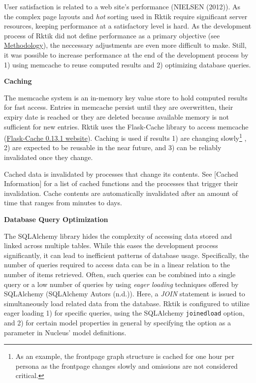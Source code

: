 
User satisfaction is related to a web site's performance (NIELSEN
(2012)). As the complex page layouts and \emph{hot} sorting used in
Rktik require significant server resources, keeping performance at a
satisfactory level is hard. As the development process of Rktik did not
define performance as a primary objective (see
\hyperref[methodology]{Methodology}), the neccessary adjustments are
even more difficult to make. Still, it was possible to increase
performance at the end of the development process by 1) using memcache
to reuse computed results and 2) optimizing database queries.

\textbf{Caching}

The memcache system is an in-memory key value store to hold computed
results for fast access. Entries in memcache persist until they are
overwritten, their expiry date is reached or they are deleted because
available memory is not sufficient for new entries. Rktik uses the
Flask-Cache library to access memcache
(\href{https://pypi.python.org/pypi/Flask-Cache/0.13.1}{Flask-Cache
0.13.1 website}). Caching is used if results 1) are changing
slowly\footnote{As an example, the frontpage graph structure is cached
  for one hour per persona as the frontpage changes slowly and omissions
  are not considered critical.} , 2) are expected to be reusable in the
near future, and 3) can be reliably invalidated once they change.

Cached data is invalidated by processes that change its contents. See
{[}Cached Information{]} for a list of cached functions and the
processes that trigger their invalidation. Cache contents are
automatically invalidated after an amount of time that ranges from
minutes to days.

\textbf{Database Query Optimization}

The SQLAlchemy library hides the complexity of accessing data stored and
linked across multiple tables. While this eases the development process
significantly, it can lead to inefficient patterns of database usage.
Specifically, the number of queries required to access data can be in a
linear relation to the number of items retrieved. Often, such queries
can be combined into a single query or a low number of queries by using
\emph{eager loading} techniques offered by SQLAlchemy (SQLAlchemy Autors
(n.d.)). Here, a \emph{JOIN} statement is issued to simultaneously load
related data from the database. Rktik is configured to utilize eager
loading 1) for specific queries, using the SQLAlchemy
\texttt{joinedload} option, and 2) for certain model properties in
general by specifying the option as a parameter in Nucleus' model
definitions.

